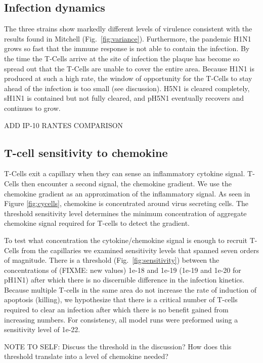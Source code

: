 \documentclass[10pt]{article}
\begin{document}
\subsection*{Infection dynamics}

The three strains show markedly different levels of virulence consistent with the results found in Mitchell (Fig.~\ref{fig:variance}).  Furthermore, the pandemic H1N1 grows so fast that the immune response is not able to contain the infection.  By the time the T-Cells arrive at the site of infection the plaque has become so spread out that the T-Cells are unable to cover the entire area.  Because H1N1 is produced at such a high rate, the window of opportunity for the T-Cells to stay ahead of the infection is too small (see discussion).  H5N1 is cleared completely, sH1N1 is contained but not fully cleared, and pH5N1 eventually recovers and continues to grow.  

ADD IP-10 RANTES COMPARISON

\subsection*{T-cell sensitivity to chemokine}

T-Cells exit a capillary when they can sense an inflammatory cytokine signal.  T-Cells then encounter a second signal, the chemokine gradient.  We use the chemokine gradient as an approximation of the inflammatory signal.  As seen in Figure \ref{fig:cycells}, chemokine is concentrated around virus secreting cells.  The threshold sensitivity level determines the minimum concentration of aggregate chemokine signal required for T-cells to detect the gradient.

To test what concentration the cytokine/chemokine signal is enough to recruit T-Cells from the capillaries we examined sensitivity levels that spanned seven orders of magnitude.  There is a threshold (Fig.~\ref{fig:sensitivity}) between the concentrations of (FIXME: new values) 1e-18 and 1e-19 (1e-19 and 1e-20 for pH1N1) after which there is no discernible difference in the infection kinetics.  Because multiple T-cells in the same area do not increase the rate of induction of apoptosis (killing), we hypothesize that there is a critical number of T-cells required to clear an infection after which there is no benefit gained from increasing numbers.  For consistency, all model runs were preformed using a sensitivity level of 1e-22.

NOTE TO SELF: Discuss the threshold in the discussion?  How does this threshold translate into a level of chemokine needed?  
\end{document}
